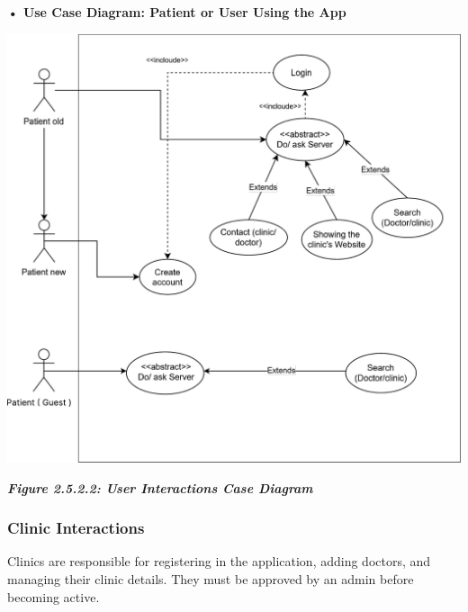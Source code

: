 \documentclass[12pt]{report}
\begin{document}
\vspace{0.5cm}
\noindent \textbf{• Use Case Diagram: Patient or User Using the App}
\vspace{0.6cm}
\begin{center}
	\includegraphics[width=\textwidth]{images/patientCas.pdf} %
\end{center}
\vspace{-0.35cm}
\begin{center}
	\textit{\textbf{Figure 2.5.2.2: User Interactions Case Diagram}}
\end{center}
\newpage
\subsubsection{\textbf{Clinic Interactions}}
Clinics are responsible for registering in the application, adding doctors, and managing their clinic details. They must be approved by an admin before becoming active.
\end{document}
